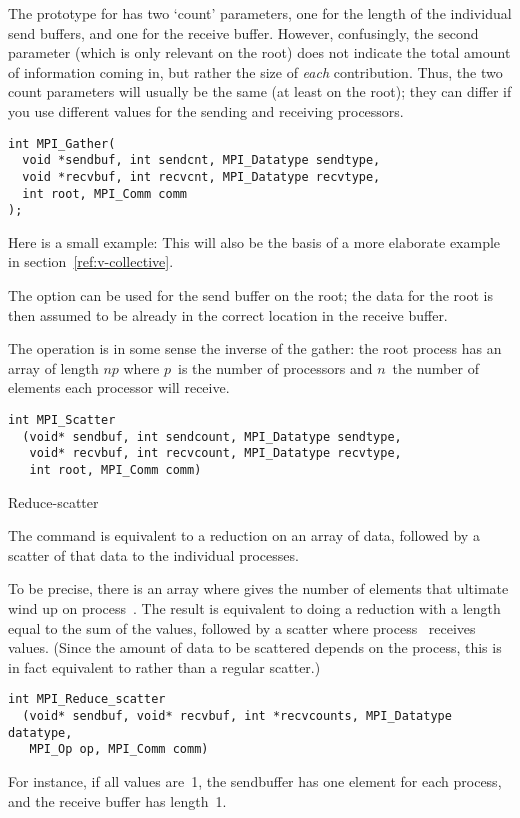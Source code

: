 The prototype for  has two `count' parameters, one
for the length of the individual send buffers, and one for the receive buffer.
However, confusingly, the second parameter (which is only relevant on the root)
does not indicate the total amount of information coming in, but
rather the size of \emph{each} contribution. Thus, the two count parameters
will usually be the same (at least on the root); they can differ if you 
use different  values for the sending and receiving
processors.
\begin{verbatim}
int MPI_Gather(
  void *sendbuf, int sendcnt, MPI_Datatype sendtype,
  void *recvbuf, int recvcnt, MPI_Datatype recvtype,
  int root, MPI_Comm comm
);
\end{verbatim}

Here is a small example:
This will also be the basis of a more elaborate example in
section~\ref{ref:v-collective}.

The  option can be used for the send buffer on the root;
the data for the root is then assumed to be already in the correct location
in the receive buffer.

The  operation is in some sense the inverse of the gather:
the root process has an array of length $np$ where $p$~is the number of processors
and $n$~the number of elements each processor will receive.
\begin{verbatim}
int MPI_Scatter
  (void* sendbuf, int sendcount, MPI_Datatype sendtype, 
   void* recvbuf, int recvcount, MPI_Datatype recvtype, 
   int root, MPI_Comm comm) 
\end{verbatim}

 {Reduce-scatter}

The  command is equivalent to a reduction
on an array of data, followed by a scatter of that data to the individual processes.

To be precise, there is an array  where  gives
the number of elements that ultimate wind up on process~.
The result is equivalent to doing a reduction with a length equal to the sum
of the  values, followed by a scatter where process~
receives  values. (Since the amount of data to be scattered
depends on the process, this is in fact equivalent to 
rather than a regular scatter.)
\begin{verbatim}
int MPI_Reduce_scatter
  (void* sendbuf, void* recvbuf, int *recvcounts, MPI_Datatype datatype, 
   MPI_Op op, MPI_Comm comm)
\end{verbatim}
For instance, if all  values are~1, the sendbuffer has one element
for each process, and the receive buffer has length~1.

